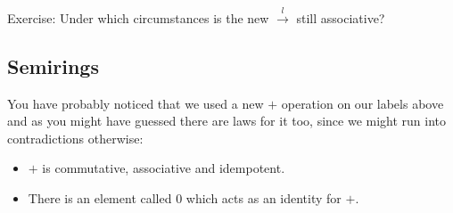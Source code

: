 \documentclass[a4paper,twocolumn]{article}
\begin{document}
Exercise: Under which circumstances is the new $\xrightarrow{l}$ still associative?

\subsection{Semirings}

You have probably noticed that we used a new $+$ operation on our labels above
and as you might have guessed there are laws for it too, since we might run into contradictions otherwise:
\begin{itemize}
\item $+$ is commutative, associative and idempotent.
\item There is an element called $0$ which acts as an identity for $+$.
\end{itemize}
\end{document}
